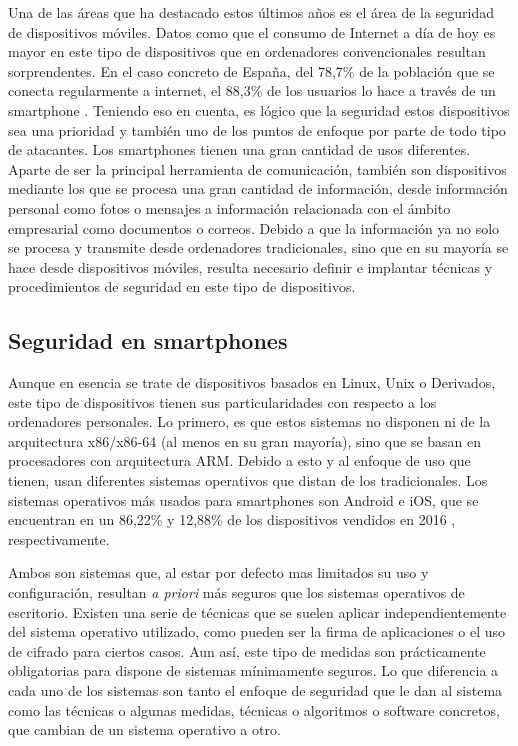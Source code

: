Una de las áreas que ha destacado estos últimos años es el área de la seguridad de dispositivos móviles. Datos como que el consumo de Internet a día de hoy es mayor en este tipo de dispositivos que en ordenadores convencionales resultan sorprendentes. En el caso concreto de España, del 78,7\% de la población que se conecta regularmente a internet, el 88,3\% de los usuarios lo hace a través de un smartphone \cite{smartphones-internet}. Teniendo eso en cuenta, es lógico que la seguridad estos dispositivos sea una prioridad y también uno de los puntos de enfoque por parte de todo tipo de atacantes.
Los smartphones tienen una gran cantidad de usos diferentes. Aparte de ser la principal herramienta de comunicación, también son dispositivos mediante los que se procesa una gran cantidad de información, desde información personal como fotos o mensajes a información relacionada con el ámbito empresarial como documentos o correos. Debido a que la información ya no solo se procesa y transmite desde ordenadores tradicionales, sino que en su mayoría se hace desde dispositivos móviles, resulta necesario definir e implantar técnicas y procedimientos de seguridad en este tipo de dispositivos.

\subsection{Seguridad en smartphones}

Aunque en esencia se trate de dispositivos basados en Linux, Unix o Derivados, este tipo de dispositivos tienen sus particularidades con respecto a los ordenadores personales. Lo primero, es que estos sistemas no disponen ni de la arquitectura x86/x86-64 (al menos en su gran mayoría), sino que se basan en procesadores con arquitectura ARM. Debido a esto y al enfoque de uso que tienen, usan diferentes sistemas operativos que distan de los tradicionales. Los sistemas operativos más usados para smartphones son Android e iOS, que se encuentran en un 86,22\% y 12,88\% de los dispositivos vendidos en 2016 \cite{gartner-uso-so}, respectivamente.

Ambos son sistemas que, al estar por defecto mas limitados su uso y configuración, resultan \textit{a priori} más seguros que los sistemas operativos de escritorio. Existen una serie de técnicas que se suelen aplicar independientemente del sistema operativo utilizado, como pueden ser la firma de aplicaciones o el uso de cifrado para ciertos casos. Aun así, este tipo de medidas son prácticamente obligatorias para dispone de sistemas mínimamente seguros. Lo que diferencia a cada uno de los sistemas son tanto el enfoque de seguridad que le dan al sistema como las técnicas o algunas medidas, técnicas o algoritmos o software concretos, que cambian de un sistema operativo a otro.

